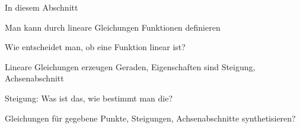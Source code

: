 \documentclass[../../main.tex]{subfiles}
\begin{document}
In diesem Abschnitt 

Man kann durch lineare Gleichungen Funktionen definieren

Wie entscheidet man, ob eine Funktion linear ist?

Lineare Gleichungen erzeugen Geraden, Eigenschaften sind Steigung, Achsenabschnitt

Steigung: Was ist das, wie bestimmt man die?

Gleichungen für gegebene Punkte, Steigungen, Achsenabschnitte synthetisieren?
\end{document}
